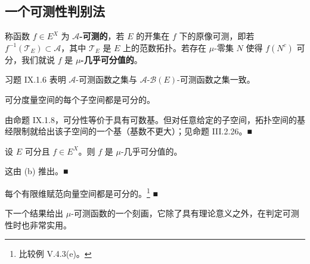 \subsection*{一个可测性判别法}

称函数 $ f \in E^X $ 为 \textbf{$ \mathcal{A} $-可测的}，若 $ E $ 的开集在 $ f $ 下的原像可测，即若 $ f^{-1}(\mathcal{T}_E) \subset \mathcal{A} $，其中 $ \mathcal{T}_E $ 是 $ E $ 上的范数拓扑。若存在 $ \mu $-零集 $ N $ 使得 $ f(N^c) $ 可分，我们就说 $ f $ 是 \textbf{$ \mu $-几乎可分值的}。

\begin{remark}

\begin{items}
\item

习题 IX.1.6 表明 $ \mathcal{A} $-可测函数之集与 $ \mathcal{A} $-$ \mathcal{B}(E) $-可测函数之集一致。

\item

可分度量空间的每个子空间都是可分的。

\proofhead
由命题 IX.1.8，可分性等价于具有可数基。但对任意给定的子空间，拓扑空间的基经限制就给出该子空间的一个基（基数不更大）；见命题 III.2.26。\nobreak\hspace{0.35em}■
\item

设 $ E $ 可分且 $ f \in E^X $。则 $ f $ 是 $ \mu $-几乎可分值的。

\proofhead
这由 (b) 推出。\nobreak\hspace{0.35em}■
\item

每个有限维赋范向量空间都是可分的。\footnote{比较例 V.4.3(e)。} \nobreak\hspace{0.35em}■

\end{items}

下一个结果给出 $ \mu $-可测函数的一个刻画，它除了具有理论意义之外，在判定可测性时也非常实用。

\end{remark}

